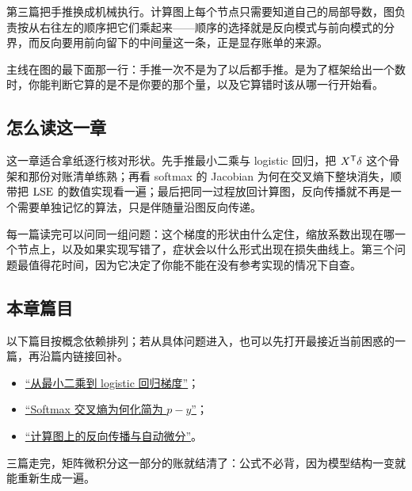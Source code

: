 第三篇把手推换成机械执行。计算图上每个节点只需要知道自己的局部导数，图负责按从右往左的顺序把它们乘起来——顺序的选择就是反向模式与前向模式的分界，而反向要用前向留下的中间量这一条，正是显存账单的来源。

主线在图的最下面那一行：手推一次不是为了以后都手推。是为了框架给出一个数时，你能判断它算的是不是你要的那个量，以及它算错时该从哪一行开始看。

\subsection{怎么读这一章}

这一章适合拿纸逐行核对形状。先手推最小二乘与 logistic 回归，把 \(X^{\mathsf{T}}\delta\) 这个骨架和那份对账清单练熟；再看 softmax 的 Jacobian 为何在交叉熵下整块消失，顺带把 \(\operatorname{LSE}\) 的数值实现看一遍；最后把同一过程放回计算图，反向传播就不再是一个需要单独记忆的算法，只是伴随量沿图反向传递。

每一篇读完可以问同一组问题：这个梯度的形状由什么定住，缩放系数出现在哪一个节点上，以及如果实现写错了，症状会以什么形式出现在损失曲线上。第三个问题最值得花时间，因为它决定了你能不能在没有参考实现的情况下自查。

\subsection{本章篇目}

以下篇目按概念依赖排列；若从具体问题进入，也可以先打开最接近当前困惑的一篇，再沿篇内链接回补。

\begin{itemize}
\tightlist
\item \hyperref[sec:10-Matrix-Calculus/04-Applications/01]{``从最小二乘到 logistic 回归梯度''}；
\item \hyperref[sec:10-Matrix-Calculus/04-Applications/02]{``\texorpdfstring{Softmax 交叉熵为何化简为 \(p-y\)}{Softmax 交叉熵为何化简为 p-y}''}；
\item \hyperref[sec:10-Matrix-Calculus/04-Applications/03]{``计算图上的反向传播与自动微分''}。
\end{itemize}

三篇走完，矩阵微积分这一部分的账就结清了：公式不必背，因为模型结构一变就能重新生成一遍。
